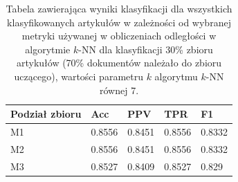 \documentclass{classrep}
\begin{document}
\begin{table}[H]
    \centering
\caption{Tabela zawierająca wyniki klasyfikacji dla wszystkich klasyfikowanych artykułów w zależności od wybranej metryki
używanej w obliczeniach odległości w algorytmie $k$-NN dla klasyfikacji 30\% zbioru
artykułów (70\% dokumentów należało do zbioru uczącego), wartości parametru $k$
algorytmu $k$-NN równej 7.}
\begin{adjustbox}{max width=\textwidth}
    \begin{tabular}{|l|l|l|l|l|}
    \hline
        Podział zbioru & Acc & PPV & TPR & F1 \\ \hline
        M1 & 0.8556 & 0.8451 & 0.8556 & 0.8332 \\ \hline
        M2 & 0.8556 & 0.8451 & 0.8556 & 0.8332 \\ \hline
        M3 & 0.8527 & 0.8409 & 0.8527 & 0.829 \\ \hline
    \end{tabular}
\end{adjustbox}
\end{table}
\end{document}
